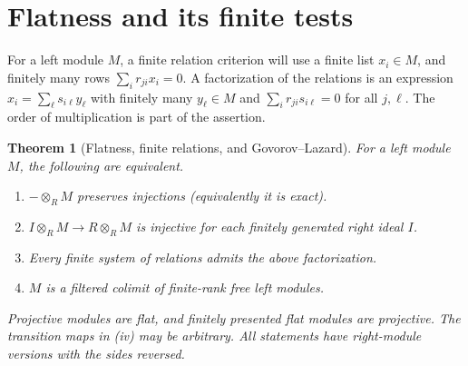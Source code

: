 \documentclass[11pt,oneside,openany]{book}
\newtheorem{theorem}{Theorem}[chapter]
\theoremstyle{definition}
\theoremstyle{remark}
\begin{document}
\section{Flatness and its finite tests}

For a left module \(M\), a finite relation criterion will use a
finite list \(x_i\in M\), and finitely many rows
\(\sum_i r_{ji}x_i=0\). A factorization of the relations is an
expression \(x_i=\sum_\ell s_{i\ell}y_\ell\) with finitely many
\(y_\ell\in M\) and \(\sum_i r_{ji}s_{i\ell}=0\) for all \(j,\ell\).
The order of multiplication is part of the assertion.

\begin{theorem}[Flatness, finite relations, and Govorov--Lazard]
\label{p103:ALG-03-C02-R04}
For a left module \(M\), the following are equivalent.
\begin{enumerate}[label=(\roman*)]
\item \(-\otimes_R M\) preserves injections (equivalently it is exact).
\item \(I\otimes_R M\to R\otimes_R M\) is injective for each
finitely generated right ideal \(I\).
\item Every finite system of relations admits the above factorization.
\item \(M\) is a filtered colimit of finite-rank free left modules.
\end{enumerate}
Projective modules are flat, and finitely presented flat modules
are projective. The transition maps in (iv) may be arbitrary.
All statements have right-module versions with the sides reversed.
\end{theorem}
\end{document}
